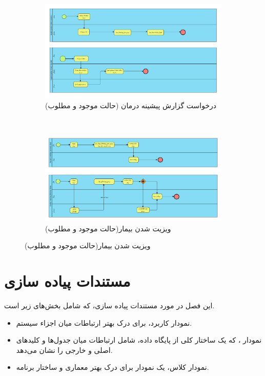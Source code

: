 \documentclass[a4paper,12pt]{report}
\begin{document}
	\pagebreak
	\begin{figure}[!h]
		\label{fig2:sec6:chap1}
		\begin{center}
			\begin{subfigure}[t]{\textwidth}
				\includegraphics[width=\linewidth]{diagrams/requestPatientHistory.pdf}
				\caption{درخواست گزارش پیشینه درمان (حالت موجود و مطلوب)}
				\label{subfig3:fig1:sec6:chap1}
			\end{subfigure}	\\
			\begin{subfigure}[t]{\textwidth}
				\includegraphics[width=\textwidth]{diagrams/visiting.pdf}
				\caption{ویزیت شدن بیمار(حالت موجود و مطلوب)}
				\label{subfig4:fig1:sec6:chap1}
			\end{subfigure}	
		\end{center}
	\end{figure}

	\pagebreak
	\chapter{
	مستندات پیاده سازی}
	\label{chp2}
این فصل در مورد مستندات پیاده سازی، که شامل بخش‌های زیر است.
	\begin{itemize}
		\item 
		نمودار کاربرد، برای درک بهتر ارتباطات میان اجزاء سیستم.
		\item
		نمودار 
		، که یک ساختار کلی از پایگاه داده، شامل ارتباطات میان جدول‌ها و کلید‌های اصلی و خارجی را نشان می‌دهد.
		\item
		نمودار کلاس،‌ یک نمودار برای درک بهتر معماری و ساختار برنامه.
	\end{itemize}
	\pagebreak
\end{document}
